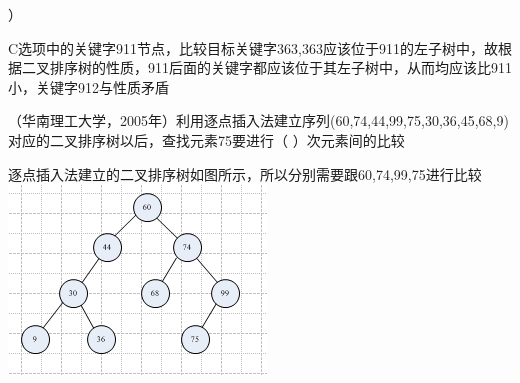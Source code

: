 ）
\par{}
\begin{solution}C选项中的关键字911节点，比较目标关键字363,363应该位于911的左子树中，故根据二叉排序树的性质，911后面的关键字都应该位于其左子树中，从而均应该比911小，关键字912与性质矛盾
\end{solution}
\question （华南理工大学，2005年）利用逐点插入法建立序列(60,74,44,99,75,30,36,45,68,9)对应的二叉排序树以后，查找元素75要进行（
）次元素间的比较
\par{}
\begin{solution}逐点插入法建立的二叉排序树如图所示，所以分别需要跟60,74,99,75进行比较
\includegraphics[width=2.69792in,height=1.98958in]{computerassets/a660a0e92897a903a7842a30c0b2bfee.png}
\end{solution}
